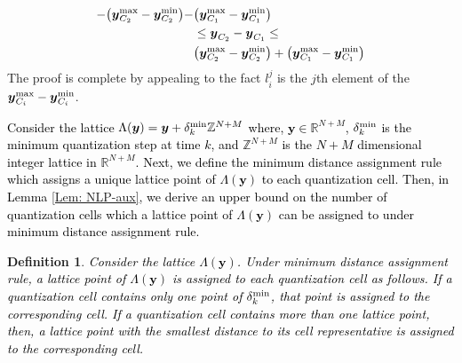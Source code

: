\documentclass[10pt,twocolumn,twoside]{IEEEtran}
\newtheorem{definition}{Definition}
\begin{document}
\begin{IEEEproof}
{\begin{align}
-{\left({{\ensuremath{\boldsymbol{{y}}}}^{\rm max}_{C_2}-{\ensuremath{\boldsymbol{{y}}}}^{\rm min}_{C_2}}\right)}-&{\left({{\ensuremath{\boldsymbol{{y}}}}^{\rm max}_{C_1}-{\ensuremath{\boldsymbol{{y}}}}^{\rm min}_{C_1}}\right)}\nonumber\\
&\leq {\ensuremath{\boldsymbol{{y}}}}_{C_2}-{\ensuremath{\boldsymbol{{y}}}}_{C_1}\leq \nonumber\\
&{\left({{\ensuremath{\boldsymbol{{y}}}}^{\rm max}_{C_2}-{\ensuremath{\boldsymbol{{y}}}}^{\rm min}_{C_2}}\right)}+{\left({{\ensuremath{\boldsymbol{{y}}}}^{\rm max}_{C_1}-{\ensuremath{\boldsymbol{{y}}}}^{\rm min}_{C_1}}\right)}
\end{align}
The proof is complete by appealing to the fact $l^j_i$ is the $j$th element of the ${\ensuremath{\boldsymbol{{y}}}}^{\rm max}_{C_i}-{\ensuremath{\boldsymbol{{y}}}}^{\rm min}_{C_i}$.}
\end{IEEEproof}
\textcolor{black}{Consider the lattice $\Lambda{\left({{\ensuremath{\boldsymbol{{y}}}}}\right)}={\ensuremath{\boldsymbol{{y}}}}+\delta^{\rm min}_k{\ensuremath{{\ensuremath{\mathbb{{Z}}}}}}^{N+M}$ where, ${\ensuremath{\boldsymbol{{y}}}}\in {\ensuremath{{\ensuremath{\mathbb{{R}}}}}}^{N+M}$, $\delta^{\rm min}_k$ is the minimum quantization step at time $k$, and ${\ensuremath{{\ensuremath{\mathbb{{Z}}}}}}^{N+M}$ is the  $N+M$ dimensional integer lattice in ${\ensuremath{{\ensuremath{\mathbb{{R}}}}}}^{N+M}$. Next, we define the minimum distance assignment rule which assigns a unique lattice point of $\Lambda{\left({{\ensuremath{\boldsymbol{{y}}}}}\right)}$ to each quantization cell. Then, in Lemma \ref{Lem: NLP-aux}, we derive an upper bound on the number of quantization cells which a lattice point of $\Lambda{\left({{\ensuremath{\boldsymbol{{y}}}}}\right)}$ can be assigned to under minimum distance assignment rule. }
\begin{definition}
\textcolor{black}{Consider the lattice $\Lambda{\left({{\ensuremath{\boldsymbol{{y}}}}}\right)}$. Under minimum distance assignment rule, a lattice point of $\Lambda{\left({{\ensuremath{\boldsymbol{{y}}}}}\right)}$ is assigned to each quantization cell as follows. If a quantization cell contains only one point of $\delta^{\rm min}_k$, that point is assigned to the corresponding cell. If a quantization cell contains more than one lattice point, then, a lattice point with the smallest distance to its cell representative is assigned to the corresponding cell.}
\end{definition}
\end{document}
